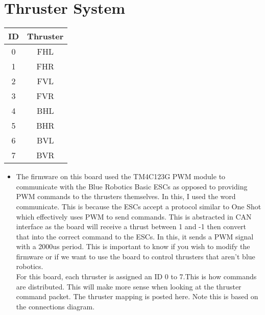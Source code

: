 \documentclass[a4paper,12pt,oneside,pdflatex,italian,final,twocolumn]{article}
\begin{document}
\pagebreak
\raggedright
\section{Thruster System}
\vspace{-2cm}
\centering
\begin{tabular}{c|c}
\toprule
ID & Thruster \\             
\midrule
0 & FHL \\
1 & FHR \\
2 & FVL \\
3 & FVR \\
4 & BHL \\
5 & BHR \\ 
6 & BVL \\
7 & BVR \\
\bottomrule
\end{tabular}

\vspace{-12cm}
\begin{itemize}
\item The firmware on this board used the TM4C123G PWM module to communicate with the Blue Robotics Basic ESCs as opposed to providing PWM commands to the thrusters themselves. In this, I used the word communicate. This is because the ESCs accept a protocol similar to One Shot which effectively uses PWM to send commands. This is abstracted in CAN interface as the board will receive a thrust between 1 and -1 then convert that into the correct command to the ESCs. In this, it sends a PWM signal with a 2000us period. This is important to know if you wish to modify the firmware or if we want to use the board to control thrusters that aren't blue robotics. \\
For this board, each thruster is assigned an ID 0 to 7.This is how commands are distributed. This will make more sense when looking at the thruster command packet. The thruster mapping is posted here. Note this is based on the connections diagram. \\
\end{itemize}

\pagebreak
\raggedright
\end{document}
